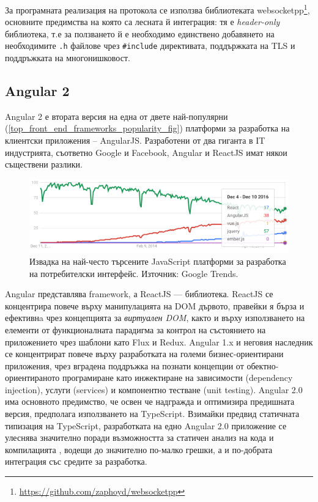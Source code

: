 \documentclass[12pt,a4paper,oneside]{book}
\begin{document}
За програмната реализация на протокола се използва библиотеката
websocketpp\footnote{\url{https://github.com/zaphoyd/websocketpp}},
основните предимства на която са лесната й интеграция: тя е \textit{header-only}
библиотека, т.е за ползването й е необходимо единствено добавянето на
необходимите \texttt{.h} файлове чрез \texttt{\#include} директивата,
поддържката на TLS и поддръжката на многонишковост.

\subsection{Angular 2}

Angular 2 е втората версия на една от двете най-популярни
(\autoref{top_front_end_frameworks_popularity_fig}) платформи за
разработка на клиентски приложения -- AngularJS. Разработени от два гиганта в IT
индустрията, съответно Google и Facebook, Angular и ReactJS имат някои
съществени разлики.

\begin{figure}[h!]
  \centering
  \includegraphics[width=1.0\textwidth]{figures/top_front_end_frameworks_popularity.png}
  \caption{Извадка на най-често търсените JavaScript платформи за разработка на
  потребителски интерфейс. Източник: Google Trends.}
  \label{top_front_end_frameworks_popularity_fig}
\end{figure}

Angular представлява framework, а ReactJS --- библиотека.
ReactJS се концентрира повече върху манипулацията на DOM дървото,
правейки я бърза и ефективнa чрез концепцията за \textit{виртуален DOM}, както и върху
използването на елементи от функционалната парадигма за контрол на състоянието
на приложението чрез шаблони като Flux и Redux. Angular 1.x и неговия наследник
се концентрират повече върху разработката на големи бизнес-ориентирани
приложения, чрез вградена поддръжка на познати концепции от
обектно-ориентираното програмиране като инжектиране на зависимости (dependency
injection), услуги (services)
и компонентно тестване (unit testing). Angular 2.0 има основното предимство, че освен че
надгражда и оптимизира предишната версия, предполага използването на TypeScript.
Взимайки предвид статичната типизация на TypeScript, разработката на едно
Angular 2.0 приложение се улеснява значително поради възможността за статичен
анализ на кода и компилацията \cite{gechev_switching_2016}, водещи до значително
по-малко грешки, а и по-добрата интеграция със средите за разработка.
\end{document}
